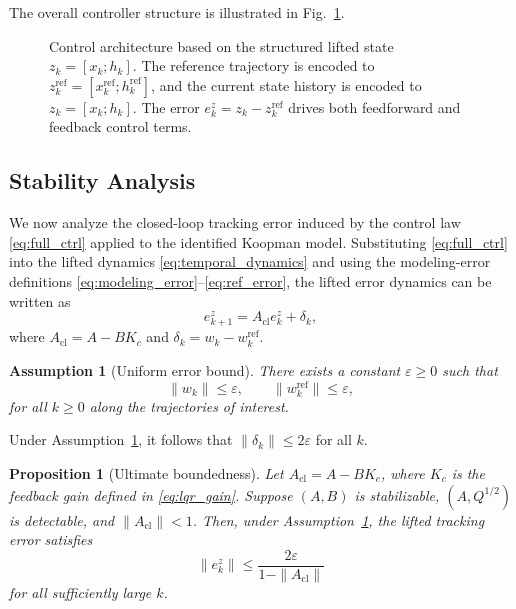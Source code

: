 \documentclass[journal]{IEEEtran}
\newtheorem{assumption}{Assumption}
\newtheorem{proposition}{Proposition}
\begin{document}
The overall controller structure is illustrated in Fig.~\ref{fig:control_architecture}.

\begin{figure}[!t]
    \centering
    \caption{Control architecture based on the structured lifted state $z_k=[x_k;h_k]$. The reference trajectory is encoded to $z_k^{\mathrm{ref}}=[x_k^{\mathrm{ref}};h_k^{\mathrm{ref}}]$, and the current state history is encoded to $z_k=[x_k;h_k]$. The error $e_k^z = z_k - z_k^{\mathrm{ref}}$ drives both feedforward and feedback control terms.}
    \label{fig:control_architecture}
\end{figure}

\subsection{Stability Analysis}
\label{subsec:stability}

We now analyze the closed-loop tracking error induced by the control law \eqref{eq:full_ctrl} applied to the identified Koopman model. Substituting \eqref{eq:full_ctrl} into the lifted dynamics \eqref{eq:temporal_dynamics} and using the modeling-error definitions \eqref{eq:modeling_error}--\eqref{eq:ref_error}, the lifted error dynamics can be written as
\begin{equation}
    e_{k+1}^z
    =
    A_{\mathrm{cl}} e_k^z + \delta_k,
    \label{eq:cl_error_dyn}
\end{equation}
where $A_{\mathrm{cl}} = A - B K_c$ and $\delta_k = w_k - w_k^{\mathrm{ref}}$.

\begin{assumption}[Uniform error bound]
\label{assump:bound}
There exists a constant $\varepsilon \geq 0$ such that
\[
\|w_k\| \leq \varepsilon,
\qquad
\|w_k^{\mathrm{ref}}\| \leq \varepsilon,
\]
for all $k \geq 0$ along the trajectories of interest.
\end{assumption}

Under Assumption~\ref{assump:bound}, it follows that $\|\delta_k\| \leq 2\varepsilon$ for all $k$.

\begin{proposition}[Ultimate boundedness]
\label{prop:ub}
Let $A_{\mathrm{cl}} = A - B K_c$, where $K_c$ is the feedback gain defined in \eqref{eq:lqr_gain}. Suppose $(A,B)$ is stabilizable, $(A,Q^{1/2})$ is detectable, and $\|A_{\mathrm{cl}}\| < 1$. Then, under Assumption~\ref{assump:bound}, the lifted tracking error satisfies
\begin{equation}
    \|e_k^z\|
    \leq
    \frac{2\varepsilon}{1 - \|A_{\mathrm{cl}}\|}
    \label{eq:ub_bound}
\end{equation}
for all sufficiently large $k$.
\end{proposition}
\end{document}
